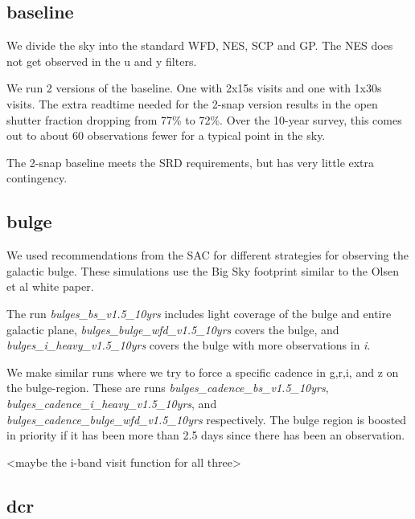 



\subsection{baseline}

We divide the sky into the standard WFD, NES, SCP and GP. The NES does not get observed in the u and y filters. 

We run 2 versions of the baseline. One with 2x15s visits and one with 1x30s visits. The extra readtime needed for the 2-snap version results in the open shutter fraction dropping from 77\% to 72\%. Over the 10-year survey, this comes out to about 60 observations fewer for a typical point in the sky. 

The 2-snap baseline meets the SRD requirements, but has very little extra contingency.

\subsection{bulge}

We used recommendations from the SAC for different strategies for observing the galactic bulge. These simulations use the Big Sky footprint similar to the Olsen et al white paper.  

The run \emph{bulges\_bs\_v1.5\_10yrs} includes light coverage of the bulge and entire galactic plane, \emph{bulges\_bulge\_wfd\_v1.5\_10yrs} covers the bulge, and \emph{bulges\_i\_heavy\_v1.5\_10yrs} covers the bulge with more observations in \emph{i}. 

We make similar runs where we try to force a specific cadence in g,r,i, and z on the bulge-region. These are runs \emph{bulges\_cadence\_bs\_v1.5\_10yrs}, \emph{bulges\_cadence\_i\_heavy\_v1.5\_10yrs}, and \emph{bulges\_cadence\_bulge\_wfd\_v1.5\_10yrs} respectively. The bulge region is boosted in priority if it has been more than 2.5 days since there has been an observation.

<maybe the i-band visit function for all three>




\subsection{dcr}

